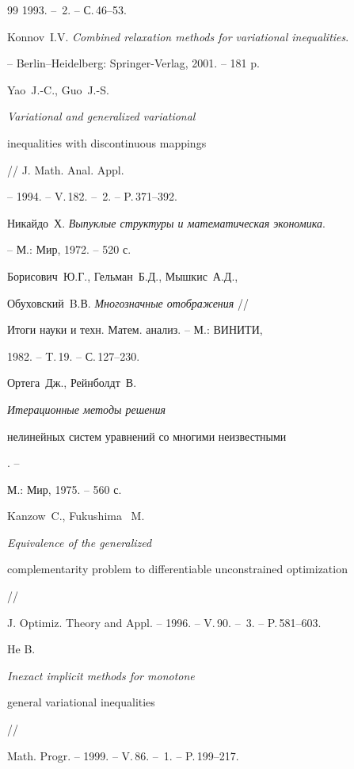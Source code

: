 \begin{thebibliography}{99}
1993. -- \No\,2. -- С.\,46--53.







Konnov~I.V. {\em Combined relaxation methods for variational inequalities}. 


-- Berlin--Heidelberg: Springer-Verlag, 2001. -- 181 p.







Yao~J.-C., Guo~J.-S. {\em Variational and generalized variational 


inequalities with discontinuous mappings} // J. Math. Anal. Appl. 


-- 1994. -- V.\,182. -- \No\,2. -- P.\,371--392.







Никайдо~Х. {\em Выпуклые структуры и математическая экономика}. 


-- М.: Мир, 1972. -- 520 с.







Борисович~Ю.Г., Гельман~Б.Д., Мышкис~А.Д.,


Обуховский~B.В. {\em Многозначные отображения} // 


Итоги науки и техн. Матем. анализ. -- М.: ВИНИТИ, 


1982. -- T.\,19. -- С.\,127--230.







Ортега~Дж., Рейнболдт~В. {\em Итерационные методы решения


нелинейных систем уравнений со многими неизвестными}. --


М.: Мир, 1975. -- 560 с.







Kanzow~C., Fukushima~ M. {\em Equivalence of the generalized


complementarity problem to differentiable unconstrained optimization} //


J. Optimiz. Theory and Appl. -- 1996. -- V.\,90. -- \No\,3. -- P.\,581--603.







He B. {\em Inexact implicit methods for monotone 


general variational inequalities} //


Math. Progr. -- 1999. -- V.\,86. -- \No\,1. -- P.\,199--217.





\end{thebibliography}





